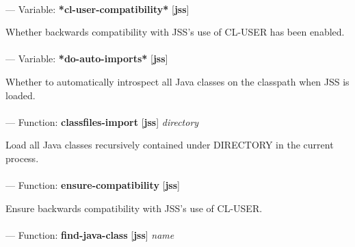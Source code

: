 \paragraph{}
\label{JSS:*CL-USER-COMPATIBILITY*}
--- Variable: \textbf{*cl-user-compatibility*} [\textbf{jss}] \textit{}

\begin{adjustwidth}{5em}{5em}
Whether backwards compatibility with JSS's use of CL-USER has been enabled.
\end{adjustwidth}

\paragraph{}
\label{JSS:*DO-AUTO-IMPORTS*}
--- Variable: \textbf{*do-auto-imports*} [\textbf{jss}] \textit{}

\begin{adjustwidth}{5em}{5em}
Whether to automatically introspect all Java classes on the classpath when JSS is loaded.
\end{adjustwidth}

\paragraph{}
\label{JSS:CLASSFILES-IMPORT}
--- Function: \textbf{classfiles-import} [\textbf{jss}] \textit{directory}

\begin{adjustwidth}{5em}{5em}
Load all Java classes recursively contained under DIRECTORY in the current process.
\end{adjustwidth}

\paragraph{}
\label{JSS:ENSURE-COMPATIBILITY}
--- Function: \textbf{ensure-compatibility} [\textbf{jss}] \textit{}

\begin{adjustwidth}{5em}{5em}
Ensure backwards compatibility with JSS's use of CL-USER.
\end{adjustwidth}

\paragraph{}
\label{JSS:FIND-JAVA-CLASS}
--- Function: \textbf{find-java-class} [\textbf{jss}] \textit{name}

